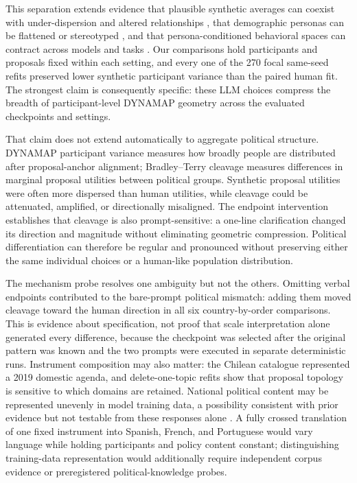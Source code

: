 \documentclass[unnumsec,webpdf,modern,large]{oup-authoring-template}
\begin{document}
This separation extends evidence that plausible synthetic averages can coexist with under-dispersion and altered relationships \citep{Bisbee2024}, that demographic personas can be flattened or stereotyped \citep{Wang2025}, and that persona-conditioned behavioral spaces can contract across models and tasks \citep{Ball2025,Xiao2026,Bhattacharyya2026}. Our comparisons hold participants and proposals fixed within each setting, and every one of the 270 focal same-seed refits preserved lower synthetic participant variance than the paired human fit. The strongest claim is consequently specific: these LLM choices compress the breadth of participant-level DYNAMAP geometry across the evaluated checkpoints and settings.

That claim does not extend automatically to aggregate political structure. DYNAMAP participant variance measures how broadly people are distributed after proposal-anchor alignment; Bradley--Terry cleavage measures differences in marginal proposal utilities between political groups. Synthetic proposal utilities were often more dispersed than human utilities, while cleavage could be attenuated, amplified, or directionally misaligned. The endpoint intervention establishes that cleavage is also prompt-sensitive: a one-line clarification changed its direction and magnitude without eliminating geometric compression. Political differentiation can therefore be regular and pronounced without preserving either the same individual choices or a human-like population distribution.

The mechanism probe resolves one ambiguity but not the others. Omitting verbal endpoints contributed to the bare-prompt political mismatch: adding them moved cleavage toward the human direction in all six country-by-order comparisons. This is evidence about specification, not proof that scale interpretation alone generated every difference, because the checkpoint was selected after the original pattern was known and the two prompts were executed in separate deterministic runs. Instrument composition may also matter: the Chilean catalogue represented a 2019 domestic agenda, and delete-one-topic refits show that proposal topology is sensitive to which domains are retained. National political content may be represented unevenly in model training data, a possibility consistent with prior evidence but not testable from these responses alone \citep{Santurkar2023,Atari2023,Lu2025}. A fully crossed translation of one fixed instrument into Spanish, French, and Portuguese would vary language while holding participants and policy content constant; distinguishing training-data representation would additionally require independent corpus evidence or preregistered political-knowledge probes.
\end{document}
